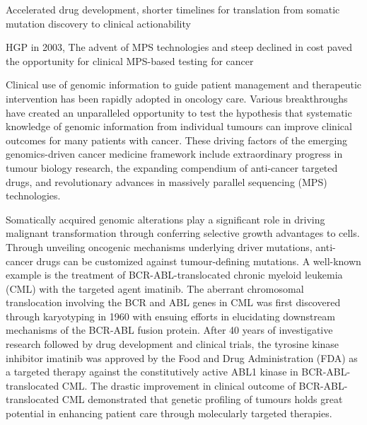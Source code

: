 Accelerated drug development, shorter timelines for translation from somatic mutation discovery to clinical actionability

HGP in 2003, The advent of MPS technologies and steep declined in cost paved the opportunity for clinical MPS-based testing for cancer



Clinical use of genomic information to guide patient management and therapeutic intervention has been rapidly adopted in oncology care. Various breakthroughs have created an unparalleled opportunity to test the hypothesis that systematic knowledge of genomic information from individual tumours can improve clinical outcomes for many patients with cancer. These driving factors of the emerging genomics-driven cancer medicine framework include extraordinary progress in tumour biology research, the expanding compendium of anti-cancer targeted drugs, and revolutionary advances in massively parallel sequencing (MPS) technologies.

Somatically acquired genomic alterations play a significant role in driving malignant transformation through conferring selective growth advantages to cells. Through unveiling oncogenic mechanisms underlying driver mutations, anti-cancer drugs can be customized against tumour-defining mutations. A well-known example is the treatment of BCR-ABL-translocated chronic myeloid leukemia (CML) with the targeted agent imatinib. The aberrant chromosomal translocation involving the BCR and ABL genes in CML was first discovered through karyotyping in 1960 with ensuing efforts in elucidating downstream mechanisms of the BCR-ABL fusion protein. After 40 years of investigative research followed by drug development and clinical trials, the tyrosine kinase inhibitor imatinib was approved by the Food and Drug Administration (FDA) as a targeted therapy against the constitutively active ABL1 kinase in BCR-ABL-translocated CML. The drastic improvement in clinical outcome of BCR-ABL-translocated CML demonstrated that genetic profiling of tumours holds great potential in enhancing patient care through molecularly targeted therapies.

